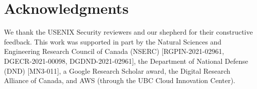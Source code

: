 \section{Acknowledgments}
We thank the USENIX Security reviewers and our shepherd for their constructive
feedback.
This work was supported in part by the Natural Sciences and Engineering Research
Council of Canada (NSERC) [RGPIN-2021-02961, DGECR-2021-00098,
DGDND-2021-02961], the Department of National Defense (DND) [MN3-011], a
Google Research Scholar award, the Digital Research Alliance of Canada, and AWS
(through the UBC Cloud Innovation Center).
